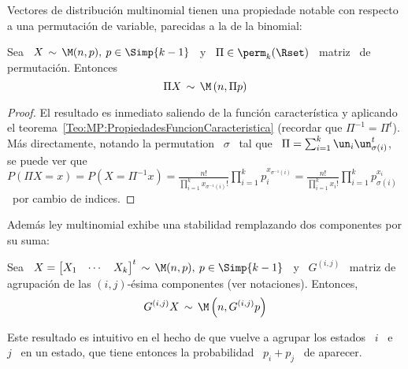 Vectores  de  distribuci\'on  multinomial  tienen  una  propiedade  notable  con
respecto a una permutaci\'on de variable, parecidas a la de la binomial:
%
\begin{lema}\label{Lem:MP:PermutacionMultinomial}
%
  Sea \ $X \, \sim \, \M(n,p), \: p \in \Simp{k-1}$ \ y \ $\Pi \in \perm_k(\Rset)$ \
  matriz \ de permutaci\'on. Entonces
  \[
  \Pi X \, \sim \, \M\left( n ,  \Pi p \right)
  \]
\end{lema}
%
\begin{proof}
  El  resultado  es  inmediato  saliendo  de  la  funci\'on  caracter\'istica  y
  aplicando  el  teorema~\ref{Teo:MP:PropiedadesFuncionCaracteristica} (recordar
  que $\Pi^{-1} = \Pi^t$). M\'as directamente, notando la permutation \ $\sigma$
  \ tal que  \ $\Pi = \sum_{i=1}^k \un_i \un_{\sigma(i)}^t$, se  puede ver que \
  $\displaystyle  P(\Pi X =  x) =  P(X =  \Pi^{-1} x)  = \frac{n!}{\prod_{i=1}^k
    x_{\sigma^{-1}(i)}!}       \prod_{i=1}^k      p_i^{x_{\sigma^{-1}(i)}}     =
  \frac{n!}{\prod_{i=1}^k x_i!}  \prod_{i=1}^k p_{\sigma(i)}^{x_i}$ \ por cambio
  de indices.
\end{proof}
%
Adem\'as ley  multinomial exhibe una stabilidad remplazando  dos componentes por
su suma:
%
\begin{lema}\label{Lem:MP:StabAgregacionMultinomial}
%
  Sea  \ $X =  \begin{bmatrix} X_1  & \cdots  & X_k  \end{bmatrix}^t \,  \sim \,
  \M(n,p), \:  p \in \Simp{k-1}$ \ y  \ $G^{(i,j)}$ \ matriz  de agrupaci\'on de
  las $(i,j)$-\'esima componentes (ver notaciones). Entonces,
  \[
  G^{(i,j)} X \, \sim \, \M\left( n , G^{(i,j)} p \right)  
  \]
\end{lema}
%
Este resultado es  intuitivo en el hecho  de que vuelve a agrupar  los estados \
$i$ \ e \ $j$ \ en un estado, que tiene entonces la probabilidad \ $p_i + p_j$ \
de aparecer.
%
